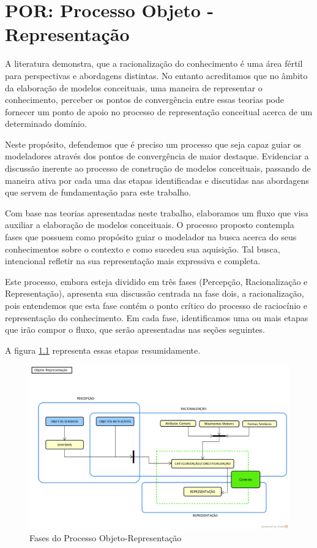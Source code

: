 

\chapter{\hspace*{3pt} POR: Processo Objeto - Representação}
\label{chap:por}

A literatura demonstra, que a racionalização do conhecimento é uma área fértil para perspectivas e abordagens distintas. No entanto acreditamos que no âmbito da elaboração de modelos conceituais, uma maneira de representar o conhecimento, perceber os pontos de convergência entre essas teorias pode fornecer um ponto de apoio no processo de representação conceitual acerca de um determinado domínio.

Neste propósito, defendemos que é preciso um processo que seja capaz guiar os modeladores através dos pontos de convergência de maior destaque. Evidenciar a discussão inerente ao processo de construção de modelos conceituais, passando de maneira ativa por cada uma das etapas identificadas e discutidas nas abordagens que servem de fundamentação para este trabalho.

Com base nas teorias apresentadas neste trabalho, elaboramos um fluxo que visa auxiliar a elaboração de modelos conceituais. O processo proposto contempla fases que possuem como propósito guiar o modelador na busca acerca do seus conhecimentos sobre o contexto e como sucedeu sua aquisição. Tal busca, intencional refletir na sua representação mais expressiva e completa.

Este processo, embora esteja dividido em três fases (Percepção, Racionalização e Representação), apresenta sua discussão centrada na fase dois, a racionalização, pois entendemos que esta fase contém o ponto crítico do processo de raciocínio e representação do conhecimento. Em cada fase, identificamos uma ou mais etapas que irão compor o fluxo, que serão apresentadas nas seções seguintes.

A figura \ref{fig:por-resumido} representa essas etapas resumidamente.
\begin{figure}
    \centering
    \includegraphics[angle=90, height=\textheight]{imagens/Fases_Processo_O-R.png}
    \caption{Fases do Processo Objeto-Representação}
    \label{fig:por-resumido}
\end{figure}

